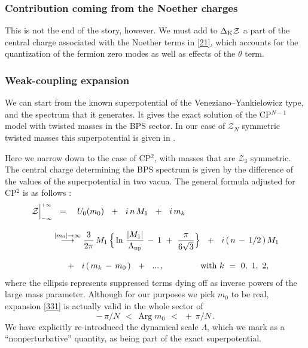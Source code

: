 \documentclass[epsfig,12pt]{article}
\def\beq{\begin{equation}}
\def\eeq{\end{equation}}
\def\beq{\begin{equation}}
\def\eeq{\end{equation}}
\newcommand{\mc}[1]{\mathcal{#1}}
\begin{document}
\subsubsection{Contribution coming from the Noether charges}

	This is not the end of the story, however. We must add to $\Delta_{\rm K}{\mathcal Z}$
	a part of the central charge associated with the Noether terms in \eqref{21}, which accounts for the quantization of the
	fermion zero modes as well as effects of the $\theta$ term.




\subsubsection{Weak-coupling expansion}
\label{weakexp}

	We can start from the known superpotential of the Veneziano--Yankielowicz type, and the spectrum that it generates.
	It gives the  exact solution of the CP$^{N-1}$ model with twisted masses in the BPS sector. 
	In our case of $\mc{Z}_N$ symmetric twisted masses this superpotential is given in \cite{Bolokhov:2011mp}.
	
	Here we narrow down to the case of CP$^2$, with masses that are $ \mc{Z}_3 $ symmetric.
	The central charge determining the BPS spectrum is given by the difference of the values of the superpotential in  two vacua.
	The general formula adjusted for CP$^2$ is as follows \cite{Bolokhov:2011mp}:
\begin{align}
%
\label{331}
       \mc{Z}\Big|^{\scriptscriptstyle +\infty}_{\scriptscriptstyle -\infty} 
       & 
	~~=~~~ 
       U_0(m_0)  ~~+~~ i\, n\, M_1 ~~+~~ i\, m_k
	\\[3mm]
%
\notag
       &
	\stackrel{|m_0|\to\infty}{\longrightarrow} 
       \frac{3}{2\pi}\, M_1\, \Big\{ \ln\, \frac {   |M_1|   }
                                                 {  \Lambda_\text{np}  } \,-\, 1 
						 ~+~ \frac{\pi}{6\sqrt{3}}
						\Big\}  ~~+~~  i\, (\,n \,-\, 1/2\,) \, M_1
	\\[3mm]
%
\notag
	&
	~~~
	~~+~~ i\, (\, m_k \,-\, m_0 \,) ~~+~~ ...\,,
	\qquad\qquad\ \text{with}~ k ~=~ 0,~1,~ 2,
\end{align}
	where the ellipsis represents  suppressed terms dying off as inverse powers of the large mass parameter.
	Although for our purposes we pick $ m_0 $ to be real, expansion \eqref{331} is actually valid in 
	the whole sector of 
\beq
	 -\,\pi / N ~~<~~ \text{Arg}\;m_0 ~~<~~ +\,\pi / N \,.
\eeq
	We have explicitly re-introduced the dynamical scale $ \Lambda $, which we mark as a 
	``nonperturbative'' quantity, as being part of the exact superpotential.
\end{document}

